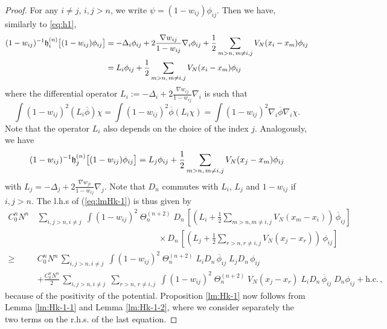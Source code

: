 \documentclass[11pt]{article}
\newcommand{\be}{\begin{equation}}
\newcommand{\ee}{\end{equation}}
\newcommand{\fh}{{\frak h}}
\begin{document}
\begin{proof}
For any $i \neq j$, $i,j
>n$, we write $\psi = (1- w_{ij}) \phi_{ij}$. Then we have,
 similarly to \eqref{eq:h1},
\begin{equation} \begin{split}
(1-w_{ij})^{-1} \fh^{(n)}_i \big[(1-w_{ij}) \phi_{ij}\big] &=
-\Delta_i \phi_{ij} + 2 \frac{ \nabla w_{ij}}{1-w_{ij}} \nabla_i
\phi_{ij} + \frac{1}{2} \sum_{m >n , \, m \neq i,j} V_N (x_i - x_m)
\phi_{ij}
\\ &= L_i \phi_{ij} + \frac{1}{2} \sum_{m >n, \, m \neq i,j} V_N (x_i - x_m)
\phi_{ij} \end{split}
\end{equation}
where the differential operator $L_i := -\Delta_i + 2 \frac{\nabla
w_{ij}}{1-w_{ij}} \nabla_i$ is such that
\be\label{eq:symmm}
 \int (1-w_{ij})^2 (L_i \overline{\phi})
 \chi = \int (1-w_{ij})^2 \overline{\phi} (L_i
\chi) = \int (1-w_{ij})^2 \nabla_i \overline{\phi} \nabla_i \chi.
\ee
Note that the operator $L_i$ also depends on the choice of the index
$j$. Analogously, we have
\[
(1-w_{ij})^{-1} \fh^{(n)}_j \big[ (1-w_{ij})\phi_{ij}\big]
 = L_j \phi_{ij} + \frac{1}{2}
\sum_{m>n, \, m \neq i,j} V_N (x_j - x_m) \phi_{ij} \] with $L_j
=-\Delta_j + 2 \frac{\nabla w_{ji}}{1-w_{ij}} \nabla_j$. Note that
$D_n$ commutes with $L_i$, $L_j$ and $1-w_{ij}$ if $i,j>n$. The
l.h.s of (\ref{eq:lmHk-1}) is thus given by
\begin{equation*}
\begin{split}
C_0^n N^n \, &\sum_{i,j > n, i\neq j} \; \int (1-w_{ij})^2 \;
\Theta^{(n+2)}_n \; D_n \, \left[ \left( L_i + \frac{1}{2} \sum_{m
>n, m \neq i,j} V_N (x_m -x_i) \right) \, \overline{\phi}_{ij}\right]
\\ & \hspace{6cm} \times D_n \, \left[ \left( L_j + \frac{1}{2}
 \sum_{r >n, r \neq i,j} V_N (x_j -x_r) \right) \, \phi_{ij}\right] \\
\geq \; & C_0^n N^n \, \sum_{i,j > n, i\neq j} \; \int (1-w_{ij})^2
\; \Theta^{(n+2)}_n \; L_i D_n \,\overline{\phi}_{ij} \; L_j D_n \,
\phi_{ij}
\\ &+ \frac{C_0^n N^n}{2} \, \sum_{i,j > n, i\neq j} \; \sum_{r>n, \, r \neq i,j} \; \int
(1-w_{ij})^2 \; \Theta^{(n+2)}_n \; V_N (x_j -x_r) \; L_i D_n \,
\overline{\phi}_{ij} \; D_n  \phi_{ij} + \text{h.c.}\, ,
\end{split}
\end{equation*}
because of the positivity of the potential. Proposition
\ref{lm:Hk-1} now follows from Lemma \ref{lm:Hk-1-1} and Lemma
\ref{lm:Hk-1-2}, where we consider separately the two terms on the
r.h.s. of the last equation.
\end{proof}
\end{document}
